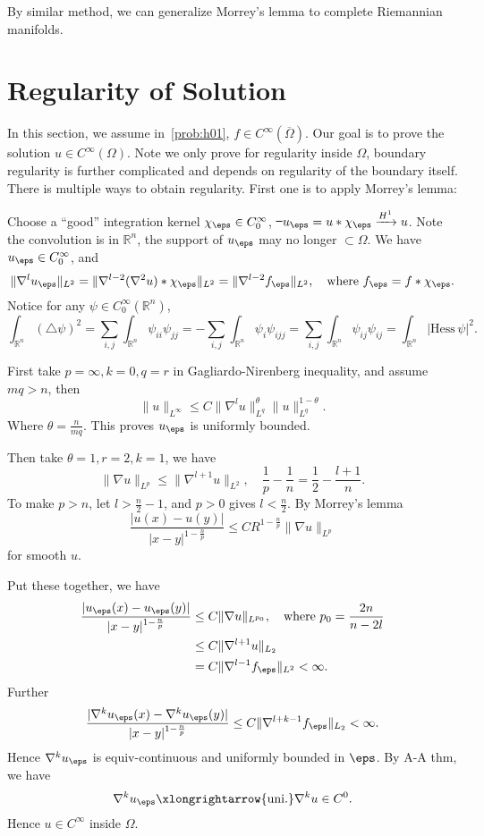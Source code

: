 \documentclass[UTF8,12pt]{article}
\numberwithin{theorem}{section}
\numberwithin{equation}{section}
\begin{document}
By similar method, we can generalize Morrey's lemma to complete Riemannian manifolds.
\begin{theorem}
    
\end{theorem}

\section{Regularity of Solution}
In this section, we assume in~\cref{prob:h01}, \(f\in C^\infty(\overline{\Omega})\).
Our goal is to prove the solution \(u\in C^\infty(\Omega)\). Note we only prove for
regularity inside \(\Omega\), boundary regularity is further complicated and depends
on regularity of the boundary itself. There is multiple ways to obtain regularity.
First one is to apply Morrey's lemma:

Choose a ``good'' integration kernel \(\chi_\eps\in C_0^\infty\), \st\ \(u_\eps=
u*\chi_\eps\xrightarrow{H^1} u\). Note the convolution is in \(\mathbb{R}^n\),
the support of \(u_\eps\) may no longer \(\subset\Omega\). We have \(u_\eps \in 
C_0^\infty\), and \[
    \|\nabla^l u_\eps\|_{L^2}=\|\nabla^{l-2}(\nabla^2 u)*\chi_\eps\|_{L^2}
    =\|\nabla^{l-2}f_\eps\|_{L^2},\quad \text{where }f_\eps=f*\chi_\eps
.\] Notice for any \(\psi\in C_0^\infty(\mathbb{R}^n)\), \[
    \int_{\mathbb{R}^n}(\triangle \psi)^2=\sum_{i,j}\int_{\mathbb{R}^n}\psi_{ii}
    \psi_{jj}=-\sum_{i,j}\int_{\mathbb{R}^n}\psi_i\psi_{ijj}
    =\sum_{i,j}\int_{\mathbb{R}^n}\psi_{ij}\psi_{ij}
    =\int_{\mathbb{R}^n}|\mathrm{Hess}\,\psi|^2
.\] 

First take \(p=\infty,k=0,q=r\) in Gagliardo-Nirenberg inequality, and assume
\(mq>n\), then \[
    \|u\|_{L^\infty}\le C\|\nabla^l u\|_{L^q}^\theta \|u\|_{L^q}^{1-\theta}
.\] Where \(\theta=\frac{n}{mq}\). This proves \(u_\eps\) is uniformly bounded.

Then take \(\theta=1,r=2,k=1\), we have \[
    \|\nabla u\|_{L^p}\le \|\nabla^{l+1}u\|_{L^2},\quad \frac{1}{p}-\frac{1}{n}
    =\frac{1}{2}-\frac{l+1}{n}
.\] To make \(p>n\), let \(l>\frac{n}{2}-1\), and \(p>0\) gives
\(l<\frac{n}{2}\). By Morrey's lemma \[
    \frac{|u(x)-u(y)|}{|x-y|^{1-\frac{n}{p}}}\le CR^{1-\frac{n}{p}}\|\nabla u\|_{L^p}
\] for smooth \(u\).

Put these together, we have
\begin{align*}
    \frac{|u_\eps(x)-u_\eps(y)|}{|x-y|^{1-\frac{n}{p}}}
    &\le C\|\nabla u\|_{L^{p_0}},\quad \text{where }p_0=\frac{2n}{n-2l} \\
    &\le C\|\nabla^{l+1}u\|_{L_2} \\
    &=C\|\nabla^{l-1}f_\eps\|_{L^2}<\infty
.\end{align*}
Further \[
    \frac{|\nabla^k u_\eps(x)-\nabla^{k}u_\eps(y)|}{|x-y|^{1-\frac{n}{p}}}
    \le C\|\nabla^{l+k-1}f_\eps\|_{L_2}<\infty
.\] Hence \(\nabla^{k}u_\eps\) is equiv-continuous and uniformly bounded in \(\eps\).
By A-A thm, we have \[
    \nabla^k u_\eps\xlongrightarrow{\text{uni.}}\nabla^k u\in C^0
.\] Hence \(u\in C^\infty\) inside \(\Omega\).
\end{document}
